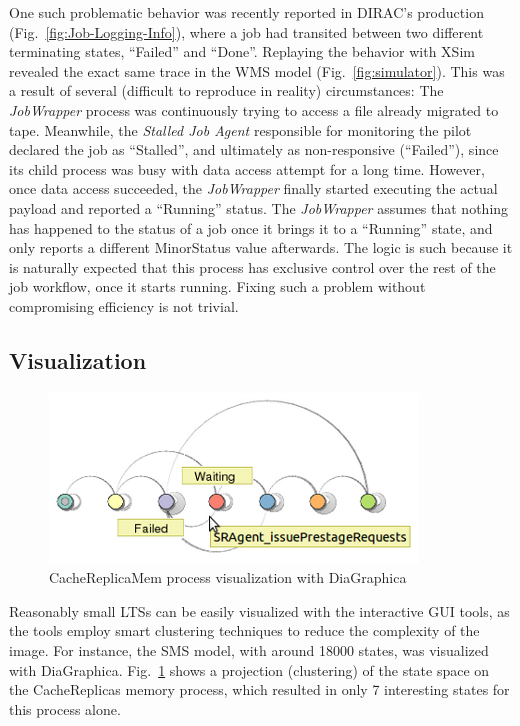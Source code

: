 \documentclass[sort&compress,preprint,3p]{elsarticle}
\begin{document}
One such problematic behavior was recently reported in DIRAC's production (Fig.~\ref{fig:Job-Logging-Info}), where
a job had transited between two different terminating states, ``Failed'' and ``Done''.
Replaying the behavior with XSim revealed the exact same trace in the WMS model (Fig.~\ref{fig:simulator}).
This was a result of several (difficult to reproduce in reality) circumstances:
The \textit{JobWrapper} process was continuously trying to access a file already 
migrated to tape. Meanwhile, the \textit{Stalled Job Agent} responsible for 
monitoring the pilot declared the job as ``Stalled'', and ultimately as non-responsive (``Failed''),
since its child process was busy with data access attempt for a long time.
However, once data access succeeded, the \textit{JobWrapper} finally started executing the 
actual payload and reported a ``Running'' status. 
The \textit{JobWrapper} assumes that nothing has happened to the status of a job once 
it brings it to a ``Running'' state, 
and only reports a different MinorStatus value afterwards.
The logic is such
because it is naturally expected that this process has exclusive control 
over the rest of the job workflow, once it starts running. Fixing such
a problem without compromising efficiency is not trivial.
\subsection{Visualization}
\begin{figure}[tp]
\vspace{-10 pt}
\includegraphics[width=0.5\linewidth,keepaspectratio=true]{./Figure7.png}
\centering
\caption{CacheReplicaMem process visualization with DiaGraphica}
\label{fig:DiaGraphica}
\end{figure}%
Reasonably small LTSs can be easily visualized with the interactive GUI tools,
as the tools employ smart clustering techniques to reduce the complexity of the image.
For instance, the SMS model, with around 18000 states,
was visualized with DiaGraphica. Fig.~\ref{fig:DiaGraphica} shows a projection (clustering) of the state space
on the CacheReplicas memory process, which resulted in only 7 interesting states for this process alone.
\end{document}
